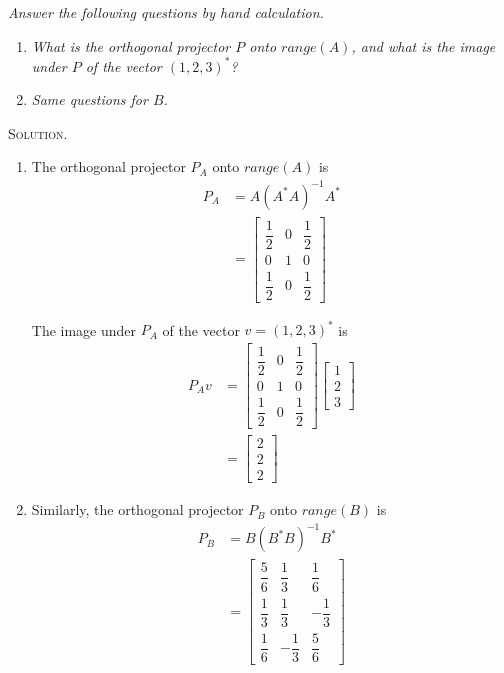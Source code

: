 \documentclass[a4paper,oneside]{book}
\numberwithin{equation}{chapter}
\begin{document}
\textit{Answer the following questions by hand calculation.}
\begin{enumerate}
\item \textit{What is the orthogonal projector $P$ onto $range\left(A\right)$, and what is the image under $P$ of the vector $\left(1,2,3\right)^*$?}
\item \textit{Same questions for $B$.}
\end{enumerate}
\textsc{Solution.} 
\begin{enumerate}
\item The orthogonal projector $P_A$ onto $range\left(A\right)$ is
\begin{align}
{P_A}& = A{\left( {{A^*}A} \right)^{ - 1}}{A^*}\\
 &= \left[ {\begin{array}{*{20}{c}}
{\dfrac{1}{2}}&0&{\dfrac{1}{2}}\\
0&1&0\\
{\dfrac{1}{2}}&0&{\dfrac{1}{2}}
\end{array}} \right]
\end{align}

The image under $P_A$ of the vector $v=\left(1,2,3\right)^*$ is
\begin{align}
{P_A}v &= \left[ {\begin{array}{*{20}{c}}
{\dfrac{1}{2}}&0&{\dfrac{1}{2}}\\
0&1&0\\
{\dfrac{1}{2}}&0&{\dfrac{1}{2}}
\end{array}} \right]\left[ {\begin{array}{*{20}{c}}
1\\
2\\
3
\end{array}} \right]\\
& = \left[ {\begin{array}{*{20}{c}}
2\\
2\\
2
\end{array}} \right]
\end{align}
\item Similarly, the orthogonal projector $P_B$ onto $range\left(B\right)$ is
\begin{align}
{P_B} &= B{\left( {{B^*}B} \right)^{ - 1}}{B^*}\\
 &= \left[ {\begin{array}{*{20}{c}}
{\dfrac{5}{6}}&{\dfrac{1}{3}}&{\dfrac{1}{6}}\\
{\dfrac{1}{3}}&{\dfrac{1}{3}}&{ - \dfrac{1}{3}}\\
{\dfrac{1}{6}}&{ - \dfrac{1}{3}}&{\dfrac{5}{6}}
\end{array}} \right]
\end{align}


\end{enumerate}
\end{document}

